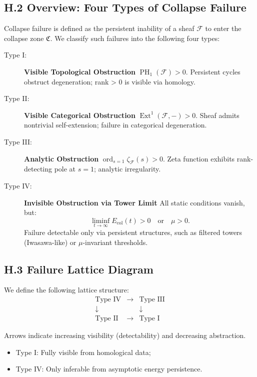 \documentclass[11pt]{article}
\DeclareMathOperator{\Ext}{Ext}
\DeclareMathOperator{\PH}{PH}
\newcommand{\ord}{\operatorname{ord}}
\begin{document}
\subsection*{H.2 Overview: Four Types of Collapse Failure}

Collapse failure is defined as the persistent inability of a sheaf \( \mathcal{F} \) to enter the collapse zone \( \mathfrak{C} \). We classify such failures into the following four types:

\begin{description}
  \item[Type I:] \textbf{Visible Topological Obstruction}  
  \( \PH_1(\mathcal{F}) > 0 \).  
  Persistent cycles obstruct degeneration; rank > 0 is visible via homology.

  \item[Type II:] \textbf{Visible Categorical Obstruction}  
  \( \Ext^1(\mathcal{F}, -) > 0 \).  
  Sheaf admits nontrivial self-extension; failure in categorical degeneration.

  \item[Type III:] \textbf{Analytic Obstruction}  
  \( \ord_{s=1} \zeta_{\mathcal{F}}(s) > 0 \).  
  Zeta function exhibits rank-detecting pole at \( s = 1 \); analytic irregularity.

  \item[Type IV:] \textbf{Invisible Obstruction via Tower Limit}  
  All static conditions vanish, but:
  \[
  \liminf_{t \to \infty} E_{\mathrm{col}}(t) > 0 \quad \text{or} \quad \mu > 0.
  \]
  Failure detectable only via persistent structures, such as filtered towers (Iwasawa-like) or \(\mu\)-invariant thresholds.
\end{description}

\subsection*{H.3 Failure Lattice Diagram}

We define the following lattice structure:
\[
\begin{array}{ccc}
\text{Type IV} & \longrightarrow & \text{Type III} \\
\downarrow &  & \downarrow \\
\text{Type II} & \longrightarrow & \text{Type I}
\end{array}
\]

\noindent
Arrows indicate increasing visibility (detectability) and decreasing abstraction.

\begin{itemize}
  \item Type I: Fully visible from homological data;
  \item Type IV: Only inferable from asymptotic energy persistence.
\end{itemize}
\end{document}
